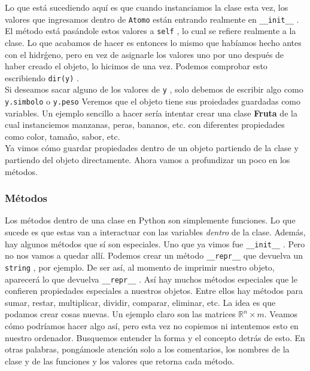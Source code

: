 \documentclass[10pt,letterpaper]{article}
\newcommand{\inlinecode}[1]{
\colorbox{light-gray}{\texttt{#1}}
}
\begin{document}
Lo que est\'a sucediendo aqu\'i es que cuando instanciamos la clase esta vez, los valores que ingresamos dentro de \inlinecode{Atomo} est\'an entrando realmente en \inlinecode{\_\_init\_\_}. El m\'etodo est\'a pas\'andole estos valores a \inlinecode{self}, lo cual se refiere realmente a la clase. Lo que acabamos de hacer es entonces lo mismo que hab\'iamos hecho antes con el hidr\'geno, pero en vez de asignarle los valores uno por uno despu\'es de haber creado el objeto, lo hicimos de una vez. Podemos comprobar esto escribiendo \inlinecode{dir(y)}.\\

Si deseamos sacar alguno de los valores de \inlinecode{y}, solo debemos de escribir algo como \inlinecode{y.simbolo} o \inlinecode{y.peso} Veremos que el objeto tiene sus proiedades guardadas como variables. Un ejemplo sencillo a hacer ser\'ia intentar crear una clase \textbf{Fruta} de la cual instanciemos manzanas, peras, bananos, etc. con diferentes propiedades como color, tama\~no, sabor, etc.\\

Ya vimos c\'omo guardar propiedades dentro de un objeto partiendo de la clase y partiendo del objeto directamente. Ahora vamos a profundizar un poco en los m\'etodos.

\subsubsection{M\'etodos}
Los m\'etodos dentro de una clase en Python son simplemente funciones. Lo que sucede es que estas van a interactuar con las variables \emph{dentro} de la clase. Adem\'as, hay algunos m\'etodos que s\'i son especiales. Uno que ya vimos fue \inlinecode{\_\_init\_\_}. Pero no nos vamos a quedar all\'i. Podemos crear un m\'etodo \inlinecode{\_\_repr\_\_} que devuelva un \inlinecode{string}, por ejemplo. De ser as\'i, al momento de imprimir nuestro objeto, aparecer\'a lo que devuelva \inlinecode{\_\_repr\_\_}. As\'i hay muchos m\'etodos especiales que le confieren propiedades especiales a nuestros objetos. Entre ellos hay m\'etodos para sumar, restar, multiplicar, dividir, comparar, eliminar, etc. La idea es que podamos crear cosas nuevas. Un ejemplo claro son las matrices $\mathbb{R}^n \times m$. Veamos c\'omo podr\'iamos hacer algo as\'i, pero esta vez no copiemos ni intentemos esto en nuestro ordenador. Busquemos entender la forma y el concepto detr\'as de esto. En otras palabras, pong\'amosle atenci\'on solo a los comentarios, los nombres de la clase y de las funciones y los valores que retorna cada m\'etodo.\\
\end{document}
